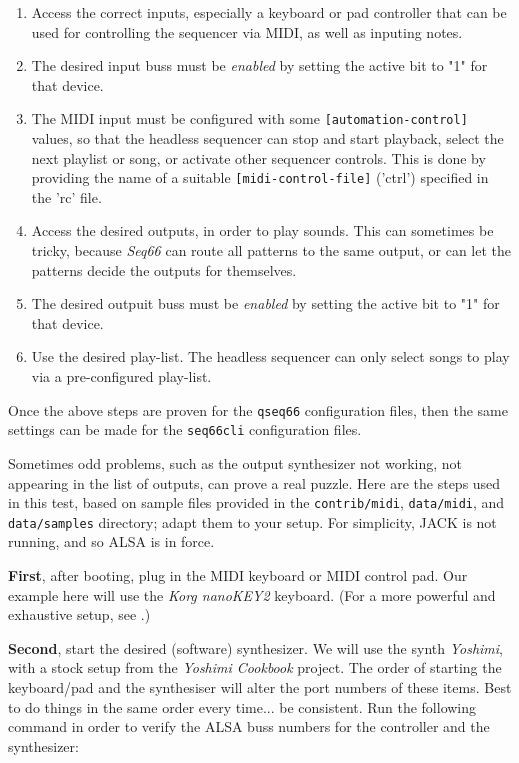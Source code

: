    \begin{enumerate}
      \item Access the correct inputs, especially a keyboard or pad controller
         that can be used for controlling the sequencer via MIDI, as well as
         inputing notes.
      \item The desired input buss must be \textsl{enabled} by setting
         the active bit to "1" for that device.
      \item The MIDI input must be configured with some
         \texttt{[automation-control]}
         values, so that the headless sequencer can stop and
         start playback, select the next playlist or song, or activate other
         sequencer controls.  This is done by providing the name of a 
         suitable
         \texttt{[midi-control-file]} ('ctrl') specified in the 'rc' file.
      \item Access the desired outputs, in order to play sounds.  This can
         sometimes be tricky, because \textsl{Seq66} can route all
         patterns to the same output, or can let the patterns decide the
         outputs for themselves.
      \item The desired outpuit buss must be \textsl{enabled} by setting
         the active bit to "1" for that device.
      \item Use the desired play-list.  The headless sequencer can only select
         songs to play via a pre-configured play-list.
   \end{enumerate}

   Once the above steps are proven for the \texttt{qseq66} configuration files,
   then the same settings can be made for the \texttt{seq66cli} configuration
   files.

   Sometimes odd problems, such as the output synthesizer not working, not
   appearing in the list of outputs, can prove a real puzzle.
   Here are the steps used in this test, based on sample files provided in the
   \texttt{contrib/midi}, \texttt{data/midi}, and \texttt{data/samples}
   directory; adapt them to your setup.  For
   simplicity, JACK is not running, and so ALSA is in force.

   \textbf{First}, after booting, plug in the MIDI keyboard or MIDI control
   pad.  Our example here will use the \textsl{Korg nanoKEY2} keyboard.  
   (For a more powerful and exhaustive setup, see
   .)

   \textbf{Second}, start the desired (software) synthesizer.  We will use the
   synth \textsl{Yoshimi}, with a stock setup from the
   \textsl{Yoshimi Cookbook} project.
   The order of starting the keyboard/pad and the synthesiser
   will alter the port numbers of these items.  Best to do things in the same
   order every time... be consistent.
   Run the following command in order to verify the ALSA buss numbers for
   the controller and the synthesizer:

